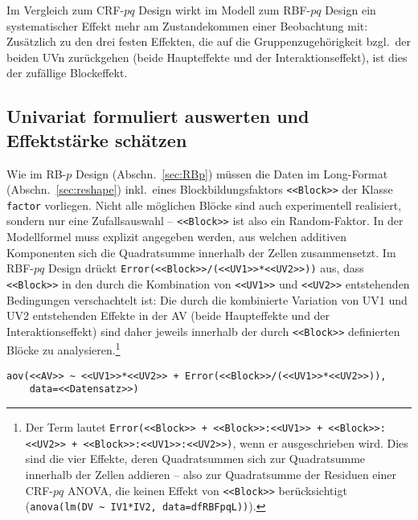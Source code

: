 Im Vergleich zum CRF-$pq$ Design wirkt im Modell zum RBF-$pq$ Design ein systematischer Effekt mehr am Zustandekommen einer Beobachtung mit: Zusätzlich zu den drei festen Effekten, die auf die Gruppenzugehörigkeit bzgl.\ der beiden UVn zurückgehen (beide Haupteffekte und der Interaktionseffekt), ist dies der zufällige Blockeffekt.

\subsection{Univariat formuliert auswerten und Effektstärke schätzen}

Wie im RB-$p$ Design (Abschn.\ \ref{sec:RBp}) müssen die Daten im Long-Format (Abschn.\ \ref{sec:reshape}) inkl.\ eines Blockbildungsfaktors \lstinline!<<Block>>! der Klasse \lstinline!factor! vorliegen. Nicht alle möglichen Blöcke sind auch experimentell realisiert, sondern nur eine Zufallsauswahl -- \lstinline!<<Block>>! ist also ein Random-Faktor. In der Modellformel muss explizit angegeben werden, aus welchen additiven Komponenten sich die Quadratsumme innerhalb der Zellen zusammensetzt. Im RBF-$pq$ Design drückt \lstinline!Error(<<Block>>/(<<UV1>>*<<UV2>>))! aus, dass \lstinline!<<Block>>! in den durch die Kombination von \lstinline!<<UV1>>! und \lstinline!<<UV2>>! entstehenden Bedingungen verschachtelt ist: Die durch die kombinierte Variation von UV1 und UV2 entstehenden Effekte in der AV (beide Haupteffekte und der Interaktionseffekt) sind daher jeweils innerhalb der durch \lstinline!<<Block>>! definierten Blöcke zu analysieren.\footnote{Der Term lautet \lstinline!Error(<<Block>> + <<Block>>:<<UV1>> + <<Block>>:<<UV2>> + <<Block>>:<<UV1>>:<<UV2>>)!, wenn er ausgeschrieben wird. Dies sind die vier Effekte, deren Quadratsummen sich zur Quadratsumme innerhalb der Zellen addieren -- also zur Quadratsumme der Residuen einer CRF-$pq$ ANOVA, die keinen Effekt von \lstinline!<<Block>>! berücksichtigt (\lstinline!anova(lm(DV ~ IV1*IV2, data=dfRBFpqL))!).}
\begin{lstlisting}
aov(<<AV>> ~ <<UV1>>*<<UV2>> + Error(<<Block>>/(<<UV1>>*<<UV2>>)),
    data=<<Datensatz>>)
\end{lstlisting}

